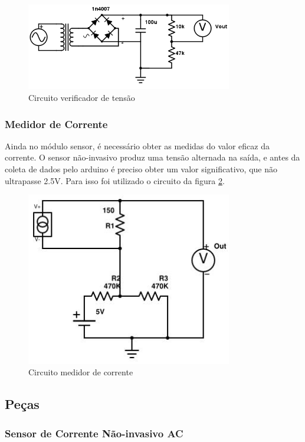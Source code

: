 \begin{figure}[H]
\centering
\includegraphics[width=9cm,keepaspectratio]{figuras/voltage-circuit.png}
\caption{\label{fig:voltage-circuit} Circuito verificador de tensão}
\end{figure}

\subsubsection{Medidor de Corrente}

Ainda no módulo sensor, é necessário obter as medidas do valor eficaz da corrente. O sensor não-invasivo produz uma tensão alternada na saída, e antes da coleta de dados pelo arduino é preciso obter um valor significativo, que não ultrapasse 2.5V. Para isso foi utilizado o circuito da figura \ref{fig:sensor-circuit}.

\begin{figure}[H]
\centering
\includegraphics[width=9cm,keepaspectratio]{figuras/current-circuit.jpg}
\caption{\label{fig:sensor-circuit} Circuito medidor de corrente}
\end{figure}
%
\subsection{Peças}
\subsubsection{Sensor de Corrente Não-invasivo AC}

